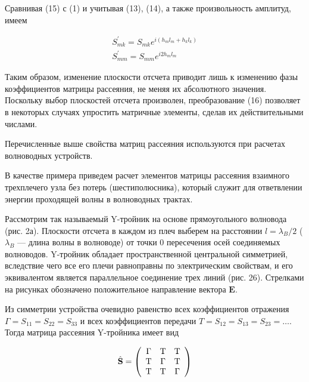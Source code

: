 ﻿\documentclass[a4paper,11pt]{article}
\begin{document}
Сравнивая (15) с (1) и учитывая (13), (14), а также произвольность амплитуд, имеем

\begin{equation}
	\begin{array} { l } { S _ { m k } ^ { \prime } = S _ { m k } e ^ { i \left( h _ { m } l _ { m } + h _ { k } l _ { k } \right) } } \\ { S _ { m m } ^ { \prime } = S _ { m m } e ^ { i 2 h _ { m } l _ { m } } } \end{array}
\end{equation}

Таким образом, изменение плоскости отсчета приводит лишь к изменению фазы коэффициентов матрицы рассеяния, не меняя их абсолютного значения. Поскольку выбор плоскостей отсчета произволен, преобразование (16) позволяет в некоторых случаях упростить матричные элементы, сделав их действительными числами.

Перечисленные выше свойства матриц рассеяния используются при расчетах волноводных устройств.

В качестве примера приведем расчет элементов матрицы рассеяния взаимного трехплечего узла без потерь (шестиполюсника), который служит для ответвлении энергии проходящей волны в волноводных трактах.

Рассмотрим так называемый Y-тройник на основе прямоугольного волновода (рис. 2а). 
Плоскости отсчета в каждом из плеч выберем на расстоянии $l=\lambda_B/2$ ($\lambda_B$ --- длина волны в волноводе) от точки 0 пересечения осей соединяемых волноводов. 
Y-тройник обладает пространственной центральной симметрией, вследствие чего все его плечи равноправны по электрическим свойствам, и его эквивалентом является параллельное соединение трех линий (рис. 26). 
Стрелками на рисунках обозначено положительное направление вектора $\mathbf{E}$.

Из симметрии устройства очевидно равенство всех коэффициентов отражения $\Gamma=S_{11}=S_{22}=S_{33}$ и всех коэффициентов передачи $T=S_{12}=S_{13}=S_{23}=\ldots$. Тогда матрица рассеяния Y-тройника имеет вид

\begin{equation}
	\hat { \mathbf { S } } = \left( \begin{array} { c c c } { \Gamma } & { \mathrm { T } } & { \mathrm { T } } \\ { \mathrm { T } } & { \Gamma } & { \mathrm { T } } \\ { \mathrm { T } } & { \mathrm { T } } & { \Gamma } \end{array} \right)
\end{equation}
\end{document}
